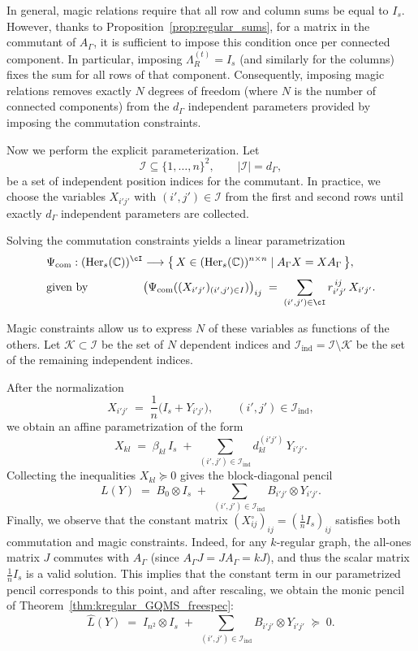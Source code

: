 \documentclass[11pt, a4paper]{article}
\theoremstyle{plain}
\theoremstyle{definition}
\theoremstyle{remark}
\newcommand{\C}{\mathbb{C}}
\newcommand{\Her}[2][\C]{\operatorname{Her}_{#2}(#1)}
\begin{document}
In general, magic relations require that all row and column sums be equal to \(I_s\).
However, thanks to Proposition~\ref{prop:regular_sums}, for a matrix in the commutant of \(A_\Gamma\), it is sufficient to impose this condition once per connected component.
In particular, imposing \(\Lambda_R^{(t)} = I_s\) (and similarly for the columns) fixes the sum for all rows of that component.
Consequently, imposing magic relations removes exactly \(N\) degrees of freedom (where \(N\) is the number of connected components) from the \(d_\Gamma\) independent parameters provided by imposing the commutation constraints.

Now we perform the explicit parameterization.
Let
\[
\mathcal{I} \subseteq \{1,\dots,n\}^2, \qquad |\mathcal{I}| = d_\Gamma,
\]
be a set of independent position indices for the commutant. In practice, we choose the variables
\(X_{i'j'}\) with \((i',j')\in \mathcal{I}\) from the first and second rows
until exactly \(d_\Gamma\) independent parameters are collected.

Solving the commutation constraints yields a linear parametrization
\[
\begin{alignedat}{2}
  &\Psi_{\mathrm{com}} : (\Her{s})^{\cI} &&\longrightarrow 
  \bigl\{\, X \in (\Her{s})^{n\times n} \mid A_\Gamma X = X A_\Gamma \,\bigr\}, \\[4pt]
  &\text{given by}\quad 
  &&\bigl(\Psi_{\mathrm{com}}((X_{i'j'})_{(i',j')\in I})\bigr)_{ij}
    \;=\; \sum_{(i',j')\in \cI} r^{\,ij}_{i'j'}\, X_{i'j'}.
\end{alignedat}
\]


Magic constraints allow us to express \(N\) of these variables as functions of the others.
Let \(\mathcal{K} \subset \mathcal{I}\) be the set of \(N\) dependent indices and \(\mathcal{I}_{\mathrm{ind}} = \mathcal{I} \setminus \mathcal{K}\) be the set of the remaining independent indices.

After the normalization
\[
X_{i'j'} \;=\; \frac{1}{n}\bigl(I_s + Y_{i'j'}\bigr),
\qquad (i',j')\in \mathcal{I}_{\mathrm{ind}},
\]
we obtain an affine parametrization of the form
\[
X_{kl} \;=\; \beta_{kl}\, I_s
  \;+\; \sum_{(i',j')\in \mathcal{I}_{\mathrm{ind}}} d_{kl}^{(i'j')}\, Y_{i'j'}.
\]
Collecting the inequalities \(X_{kl}\succeq 0\) gives the block-diagonal pencil
\[
L(Y) \;=\; B_0 \otimes I_s
  \;+\; \sum_{(i',j')\in \mathcal{I}_{\mathrm{ind}}} B_{i'j'} \otimes Y_{i'j'}.
\]
Finally, we observe that the constant matrix \(\left(X^\circ_{ij}\right)_{ij}=\left(\tfrac{1}{n}I_s\right)_{ij}\) satisfies both commutation and magic constraints. 
Indeed, for any \(k\)-regular graph, the all-ones matrix \(J\) commutes with \(A_\Gamma\) (since \(A_\Gamma J = J A_\Gamma = kJ\)), and thus the scalar matrix \(\tfrac{1}{n}I_s\) is a valid solution.
This implies that the constant term in our parametrized pencil corresponds to this point, and after rescaling, we obtain the monic pencil of Theorem~\ref{thm:kregular_GQMS_freespec}:
\[
\widehat L(Y)
 \;=\; I_{n^2} \otimes I_s
   \;+\; \sum_{(i',j')\in \mathcal{I}_{\mathrm{ind}}} B_{i'j'} \otimes Y_{i'j'}
 \;\succeq\; 0.
\]
\end{document}
